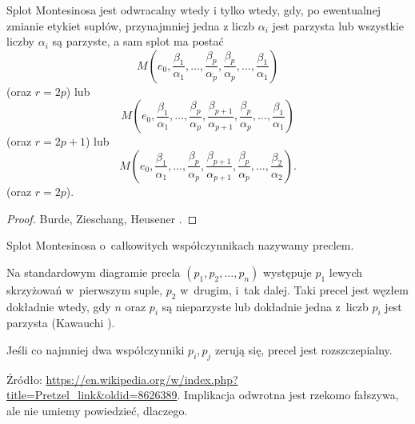 \begin{proposition}
%
    Splot Montesinosa jest odwracalny wtedy i tylko wtedy, gdy, po ewentualnej zmianie etykiet supłów, przynajmniej jedna z liczb $\alpha_i$ jest parzysta lub wszystkie liczby $\alpha_i$ są parzyste, a sam splot ma postać
    \begin{equation}
        M\left(e_0, \frac{\beta_1}{\alpha_1}, \ldots, \frac{\beta_p}{\alpha_p}, \frac{\beta_p}{\alpha_p}, \ldots, \frac{\beta_1}{\alpha_1}\right)
    \end{equation}
    (oraz $r = 2p$) lub
    \begin{equation}
        M\left(e_0, \frac{\beta_1}{\alpha_1}, \ldots, \frac{\beta_p}{\alpha_p}, \frac{\beta_{p+1}}{\alpha_{p+1}}, \frac{\beta_p}{\alpha_p}, \ldots, \frac{\beta_1}{\alpha_1}\right)
    \end{equation}
    (oraz $r = 2p+1$) lub
    \begin{equation}
         M\left(e_0, \frac{\beta_1}{\alpha_1}, \ldots, \frac{\beta_p}{\alpha_p}, \frac{\beta_{p+1}}{\alpha_{p+1}}, \frac{\beta_p}{\alpha_p}, \ldots, \frac{\beta_2}{\alpha_2}\right).
    \end{equation}
    (oraz $r = 2p$).
\end{proposition}

\begin{proof}
    Burde, Zieschang, Heusener \cite[s. 231]{burde2014}.
\end{proof}

%

\begin{definition}[precel]
\label{def:pretzel}%
    Splot Montesinosa o~całkowitych współczynnikach nazywamy preclem.
\end{definition}

Na standardowym diagramie precla $(p_1, p_2, \ldots, p_n)$ występuje $p_1$ lewych skrzyżowań w~pierwszym suple, $p_2$ w~drugim, i~tak dalej.
Taki precel jest węzłem dokładnie wtedy, gdy $n$ oraz $p_i$ są nieparzyste lub dokładnie jedna z~liczb $p_i$ jest parzysta (Kawauchi \cite[s. 27]{kawauchi1996}).

\begin{proposition}
    Jeśli co najmniej dwa współczynniki $p_i, p_j$ zerują się, precel jest rozszczepialny.
\end{proposition}

Źródło: {\small\url{https://en.wikipedia.org/w/index.php?title=Pretzel_link&oldid=8626389}}.
Implikacja odwrotna jest rzekomo fałszywa, ale nie umiemy powiedzieć, dlaczego.

